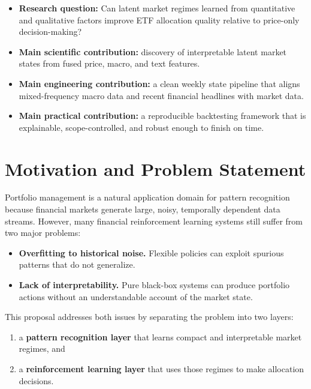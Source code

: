 \documentclass[11pt,a4paper]{article}
\begin{document}
\begin{summarybox}[title=\textbf{Proposal At a Glance}]
\begin{itemize}[leftmargin=1.4em]
  \item \textbf{Research question:} Can latent market regimes learned from quantitative and qualitative factors improve ETF allocation quality relative to price-only decision-making?
  \item \textbf{Main scientific contribution:} discovery of interpretable latent market states from fused price, macro, and text features.
  \item \textbf{Main engineering contribution:} a clean weekly state pipeline that aligns mixed-frequency macro data and recent financial headlines with market data.
  \item \textbf{Main practical contribution:} a reproducible backtesting framework that is explainable, scope-controlled, and robust enough to finish on time.
\end{itemize}
\end{summarybox}

\section{Motivation and Problem Statement}

Portfolio management is a natural application domain for pattern recognition because financial markets generate large, noisy, temporally dependent data streams.
However, many financial reinforcement learning systems still suffer from two major problems:

\begin{itemize}[leftmargin=1.4em]
  \item \textbf{Overfitting to historical noise.} Flexible policies can exploit spurious patterns that do not generalize.
  \item \textbf{Lack of interpretability.} Pure black-box systems can produce portfolio actions without an understandable account of the market state.
\end{itemize}

This proposal addresses both issues by separating the problem into two layers:

\begin{enumerate}[leftmargin=1.5em]
  \item a \textbf{pattern recognition layer} that learns compact and interpretable market regimes, and
  \item a \textbf{reinforcement learning layer} that uses those regimes to make allocation decisions.
\end{enumerate}
\end{document}
